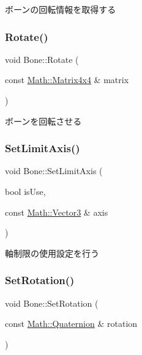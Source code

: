 ボーンの回転情報を取得する 

\mbox{\label{class_bone_ab75e73a4a7ea9901ee53a686953ade2d}} 
\subsubsection{\texorpdfstring{Rotate()}{Rotate()}}
{\footnotesize\ttfamily void Bone\+::\+Rotate (\begin{DoxyParamCaption}\item[{const \mbox{\hyperlink{struct_math_1_1_matrix4x4}{Math\+::\+Matrix4x4}} \&}]{matrix }\end{DoxyParamCaption})}



ボーンを回転させる 

\mbox{\label{class_bone_a13f0dd0077175c8d8e446b8aaadcc85e}} 
\subsubsection{\texorpdfstring{Set\+Limit\+Axis()}{SetLimitAxis()}}
{\footnotesize\ttfamily void Bone\+::\+Set\+Limit\+Axis (\begin{DoxyParamCaption}\item[{bool}]{is\+Use,  }\item[{const \mbox{\hyperlink{struct_math_1_1_vector3}{Math\+::\+Vector3}} \&}]{axis }\end{DoxyParamCaption})}



軸制限の使用設定を行う 

\mbox{\label{class_bone_a4d328e19a6a90cb28bfe016a16eeac94}} 
\subsubsection{\texorpdfstring{Set\+Rotation()}{SetRotation()}\hspace{0.1cm}{\footnotesize\ttfamily [1/3]}}
{\footnotesize\ttfamily void Bone\+::\+Set\+Rotation (\begin{DoxyParamCaption}\item[{const \mbox{\hyperlink{struct_math_1_1_quaternion}{Math\+::\+Quaternion}} \&}]{rotation }\end{DoxyParamCaption})}



